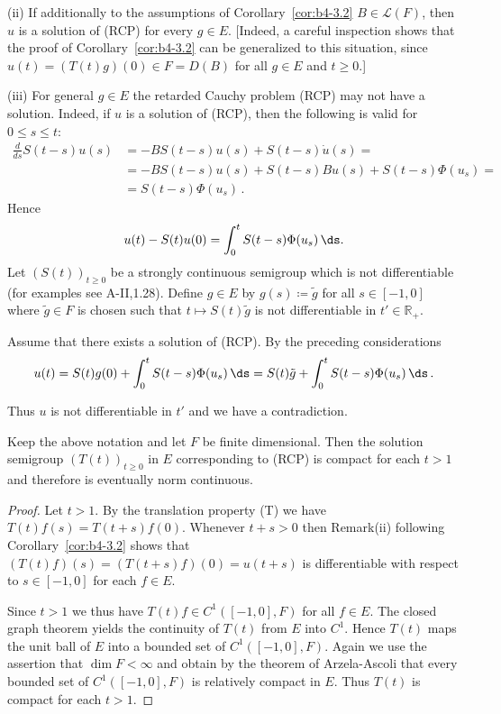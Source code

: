 (ii) If additionally to the assumptions of Corollary~\ref{cor:b4-3.2} $B \in \mathcal{L}(F)$, then $u$ is a solution of (RCP) for every $g \in E$. [Indeed, a careful inspection shows that the proof of Corollary~\ref{cor:b4-3.2} can be generalized to this situation, since $u(t) = (T(t)g)(0) \in F = D(B)$ for all $g \in E$ and $t \geq 0$.]

(iii) For general $g \in E$ the retarded Cauchy problem (RCP) may not have a solution. Indeed, if $u$ is a solution of (RCP), then the following is valid for $0 \leq s \leq t$:
\begin{equation*}
	\begin{aligned}
\frac{d}{ds}S(t-s)u(s) &= -BS(t-s)u(s) + S(t-s)\dot{u}(s) =\\
& = -BS(t-s)u(s) + S(t-s)Bu(s) + S(t-s)\Phi(u_s) = \\ & =S(t-s)\Phi(u_s)\,.
\end{aligned}
\end{equation*} 
Hence
\[
u(t) - S(t)u(0) = \int_0^t S(t-s)\Phi(u_s) \,\ds.
\]
Let $(S(t))_{t \geq 0}$ be a strongly continuous semigroup which is not differentiable (for examples see A-II,1.28). Define $g \in E$ by $g(s)  \coloneq  \tilde{g}$ for all $s \in [-1,0]$ where $\tilde{g} \in F$ is chosen such that
%
%
%
%
\newpage
%
%
$t \mapsto S(t)\tilde{g}$ is not differentiable in $t' \in \mathbb{R}_+$.

Assume that there exists a solution of (RCP). By the preceding considerations
\[
u(t) = S(t)g(0) + \int_0^t S(t-s)\Phi(u_s) \,\ds = S(t)\tilde{g} + \int_0^t S(t-s)\Phi(u_s) \,\ds\,.
\]

Thus $u$ is not differentiable in $t'$ and we have a contradiction.
\begin{corollary}\label{cor:b4-3.3}
	Keep the above notation and let $F$ be finite dimensional. Then the solution semigroup $(T(t))_{t \geq 0}$ in $E$ corresponding to (RCP) is compact for each $t > 1$ and therefore is eventually norm continuous.
\end{corollary}

\begin{proof} 
Let $t > 1$. By the translation property (T) we have $T(t)f(s) = T(t+s)f(0)$. Whenever $t + s > 0$ then Remark(ii) following Corollary~\ref{cor:b4-3.2} shows that $(T(t)f)(s) = (T(t+s)f)(0) = u(t+s)$ is differentiable with respect to $s \in [-1,0]$ for each $f \in E$.

Since $t > 1$ we thus have $T(t)f \in C^1([-1,0],F)$ for all $f \in E$. The closed graph theorem yields the continuity of $T(t)$ from $E$ into $C^1$. Hence $T(t)$ maps the unit ball of $E$ into a bounded set of $C^1([-1,0],F)$. Again we use the assertion that $\dim F < \infty$ and obtain by the theorem of Arzela-Ascoli that every bounded set of $C^1([-1,0],F)$ is relatively compact in $E$. Thus $T(t)$ is compact for each $t > 1$.
\end{proof}


